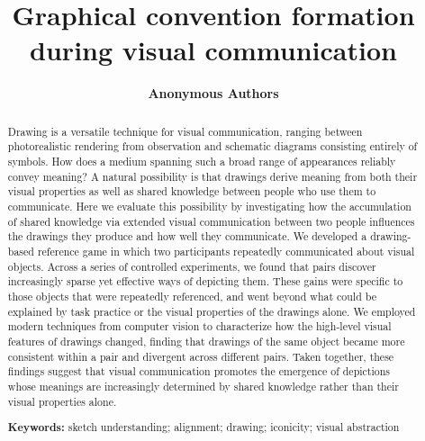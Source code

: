 \documentclass[10pt,letterpaper]{article}
\title{Graphical convention formation during visual communication}
\author{\large \bf Anonymous Authors}
\begin{document}
\maketitle

\begin{abstract}
Drawing is a versatile technique for visual communication, ranging between photorealistic rendering from observation and schematic diagrams consisting entirely of symbols. 
How does a medium spanning such a broad range of appearances reliably convey meaning?
A natural possibility is that drawings derive meaning from both their visual properties as well as shared knowledge between people who use them to communicate. 
Here we evaluate this possibility by investigating how the accumulation of shared knowledge via extended visual communication between two people influences the drawings they produce and how well they communicate. 
We developed a drawing-based reference game in which two participants repeatedly communicated about visual objects. 
Across a series of controlled experiments, we found that pairs discover increasingly sparse yet effective ways of depicting them. 
These gains were specific to those objects that were repeatedly referenced, and went beyond what could be explained by task practice or the visual properties of the drawings alone. 
We employed modern techniques from computer vision to characterize how the high-level visual features of drawings changed, finding that drawings of the same object became more consistent within a pair and divergent across different pairs.
Taken together, these findings suggest that visual communication promotes the emergence of depictions whose meanings are increasingly determined by shared knowledge rather than their visual properties alone.

\textbf{Keywords:}
sketch understanding; alignment; drawing; iconicity; visual abstraction


\end{abstract}
\end{document}
